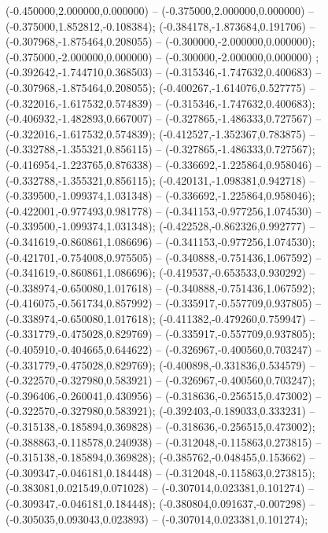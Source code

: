  (-0.450000,2.000000,0.000000) -- (-0.375000,2.000000,0.000000) -- (-0.375000,1.852812,-0.108384);
 (-0.384178,-1.873684,0.191706) -- (-0.307968,-1.875464,0.208055) -- (-0.300000,-2.000000,0.000000);
 (-0.375000,-2.000000,0.000000) -- (-0.300000,-2.000000,0.000000) ;
 (-0.392642,-1.744710,0.368503) -- (-0.315346,-1.747632,0.400683) -- (-0.307968,-1.875464,0.208055);
 (-0.400267,-1.614076,0.527775) -- (-0.322016,-1.617532,0.574839) -- (-0.315346,-1.747632,0.400683);
 (-0.406932,-1.482893,0.667007) -- (-0.327865,-1.486333,0.727567) -- (-0.322016,-1.617532,0.574839);
 (-0.412527,-1.352367,0.783875) -- (-0.332788,-1.355321,0.856115) -- (-0.327865,-1.486333,0.727567);
 (-0.416954,-1.223765,0.876338) -- (-0.336692,-1.225864,0.958046) -- (-0.332788,-1.355321,0.856115);
 (-0.420131,-1.098381,0.942718) -- (-0.339500,-1.099374,1.031348) -- (-0.336692,-1.225864,0.958046);
 (-0.422001,-0.977493,0.981778) -- (-0.341153,-0.977256,1.074530) -- (-0.339500,-1.099374,1.031348);
 (-0.422528,-0.862326,0.992777) -- (-0.341619,-0.860861,1.086696) -- (-0.341153,-0.977256,1.074530);
 (-0.421701,-0.754008,0.975505) -- (-0.340888,-0.751436,1.067592) -- (-0.341619,-0.860861,1.086696);
 (-0.419537,-0.653533,0.930292) -- (-0.338974,-0.650080,1.017618) -- (-0.340888,-0.751436,1.067592);
 (-0.416075,-0.561734,0.857992) -- (-0.335917,-0.557709,0.937805) -- (-0.338974,-0.650080,1.017618);
 (-0.411382,-0.479260,0.759947) -- (-0.331779,-0.475028,0.829769) -- (-0.335917,-0.557709,0.937805);
 (-0.405910,-0.404665,0.644622) -- (-0.326967,-0.400560,0.703247) -- (-0.331779,-0.475028,0.829769);
 (-0.400898,-0.331836,0.534579) -- (-0.322570,-0.327980,0.583921) -- (-0.326967,-0.400560,0.703247);
 (-0.396406,-0.260041,0.430956) -- (-0.318636,-0.256515,0.473002) -- (-0.322570,-0.327980,0.583921);
 (-0.392403,-0.189033,0.333231) -- (-0.315138,-0.185894,0.369828) -- (-0.318636,-0.256515,0.473002);
 (-0.388863,-0.118578,0.240938) -- (-0.312048,-0.115863,0.273815) -- (-0.315138,-0.185894,0.369828);
 (-0.385762,-0.048455,0.153662) -- (-0.309347,-0.046181,0.184448) -- (-0.312048,-0.115863,0.273815);
 (-0.383081,0.021549,0.071028) -- (-0.307014,0.023381,0.101274) -- (-0.309347,-0.046181,0.184448);
 (-0.380804,0.091637,-0.007298) -- (-0.305035,0.093043,0.023893) -- (-0.307014,0.023381,0.101274);
